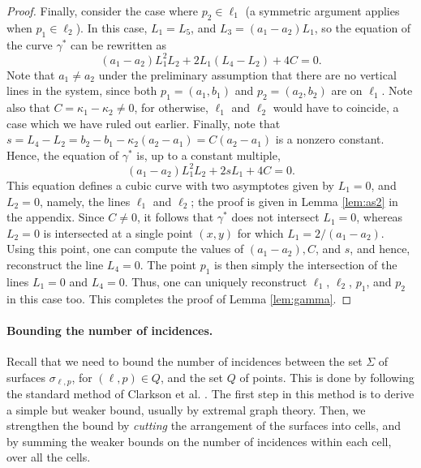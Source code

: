 \documentclass[12pt]{article}
\begin{document}
\begin{proof}
Finally, consider the case where $p_2 \in \ell_1$ (a symmetric argument
applies when $p_1 \in \ell_2$).
In this case, $L_1 = L_5$, and $L_3 = (a_1 - a_2)L_1$, so the
equation of the curve $\gamma^*$ can be rewritten as
\[
(a_1 - a_2)L_1^2L_2 + 2L_1(L_4 - L_2) + 4C = 0.
\]
Note that $a_1 \ne a_2$ under the preliminary assumption that there
are no vertical lines in the system, since both $p_1 = (a_1,b_1)$
and $p_2 = (a_2,b_2)$ are on $\ell_1$.
Note also that $C = \kappa_1 - \kappa_2 \ne 0$, for otherwise,
$\ell_1$ and $\ell_2$ would have to coincide, a case which we
have ruled out earlier.
Finally, note that $s = L_4 - L_2 = b_2 - b_1 - \kappa_2(a_2 - a_1)
= C(a_2 - a_1)$ is a nonzero constant.
Hence, the equation of $\gamma^*$ is, up to a constant multiple,
\begin{equation} \label{eq:m13}
(a_1 - a_2)L_1^2L_2 + 2sL_1 + 4C = 0.
\end{equation}
This equation defines a cubic curve with two asymptotes given by
$L_1 = 0$, and $L_2 = 0$, namely, the lines $\ell_1$ and $\ell_2$;
the proof is given in Lemma \ref{lem:as2} in the appendix.
Since $C \ne 0$, it follows that
$\gamma^*$ does not intersect $L_1 = 0$, whereas $L_2 = 0$ is
intersected at a single point $(x,y)$ for which $L_1 = 2/(a_1-a_2)$.
Using this point, one can compute the values of $(a_1-a_2), C$, and
$s$, and hence, reconstruct the line $L_4 = 0$.
The point $p_1$ is then simply the intersection of the lines $L_1 = 0$
and $L_4 = 0$. Thus, one can uniquely reconstruct $\ell_1$, $\ell_2$,
$p_1$, and $p_2$ in this case too.
This completes the proof of Lemma \ref{lem:gamma}.
\end{proof}

\paragraph{Bounding the number of incidences.}
Recall that we need to bound the number of incidences between the set
$\Sigma$ of surfaces $\sigma_{\ell,p}$, for $(\ell,p) \in Q$,
and the set $Q$ of points. This is done by following the standard
method of Clarkson et al. \cite{CEGSW}.
The first step in this method is to derive a simple but weaker
bound, usually by extremal graph theory. Then, we strengthen the bound
by {\em cutting} the arrangement of the surfaces into cells, and by
summing the weaker bounds on the number of incidences within each cell,
over all the cells.
\end{document}
